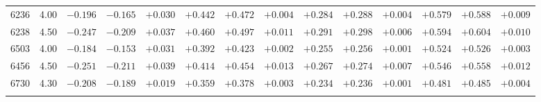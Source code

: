 \documentclass[]{aa}
\begin{document}
\begin{appendix}
\begin{table*}
\begin{center}
\begin{tabular}{llllllllllllll}
6236  &4.00 &$ -0.196$ &$ -0.165$ &$ +0.030$ &$ +0.442$ &$ +0.472$ &$ +0.004$ &$ +0.284$ &$ +0.288$ &$ +0.004$ &$ +0.579$ &$ +0.588$ &$ +0.009$\\
6238  &4.50 &$ -0.247$ &$ -0.209$ &$ +0.037$ &$ +0.460$ &$ +0.497$ &$ +0.011$ &$ +0.291$ &$ +0.298$ &$ +0.006$ &$ +0.594$ &$ +0.604$ &$ +0.010$\\
6503  &4.00 &$ -0.184$ &$ -0.153$ &$ +0.031$ &$ +0.392$ &$ +0.423$ &$ +0.002$ &$ +0.255$ &$ +0.256$ &$ +0.001$ &$ +0.524$ &$ +0.526$ &$ +0.003$\\
6456  &4.50 &$ -0.251$ &$ -0.211$ &$ +0.039$ &$ +0.414$ &$ +0.454$ &$ +0.013$ &$ +0.267$ &$ +0.274$ &$ +0.007$ &$ +0.546$ &$ +0.558$ &$ +0.012$\\
6730  &4.30 &$ -0.208$ &$ -0.189$ &$ +0.019$ &$ +0.359$ &$ +0.378$ &$ +0.003$ &$ +0.234$ &$ +0.236$ &$ +0.001$ &$ +0.481$ &$ +0.485$ &$ +0.004$\\
\hline\noalign{\smallskip}
\hline\noalign{\smallskip}
\end{tabular}
\end{center}
\end{table*}


\end{appendix}
\end{document}
